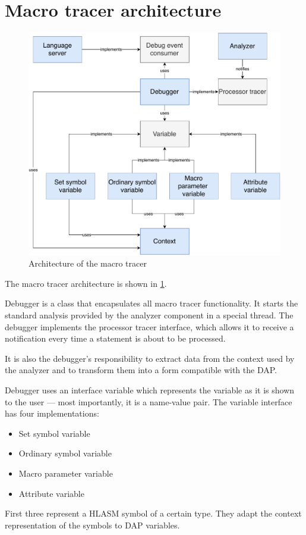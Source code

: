 \section{Macro tracer architecture}
\begin{figure}
	\centering
	\includegraphics[width=\textwidth]{img/macro_tracer_arch}
	\caption{Architecture of the macro tracer}
	\label{macro_tracer_arch}
\end{figure}

The macro tracer architecture is shown in \cref{macro_tracer_arch}.

Debugger is a class that encapsulates all macro tracer functionality. It starts the standard analysis provided by the analyzer component in a special thread. The debugger implements the processor tracer interface, which allows it to receive a notification every time a statement is about to be processed.

It is also the debugger's responsibility to extract data from the context used by the analyzer and to transform them into a form compatible with the DAP.

Debugger uses an interface variable which represents the variable as it is shown to the user --- most importantly, it is a name-value pair. The variable interface has four implementations:
\begin{itemize}
	\item Set symbol variable
	\item Ordinary symbol variable
	\item Macro parameter variable
	\item Attribute variable
\end{itemize}
First three represent a HLASM symbol of a certain type. They adapt the context representation of the symbols to DAP variables.

